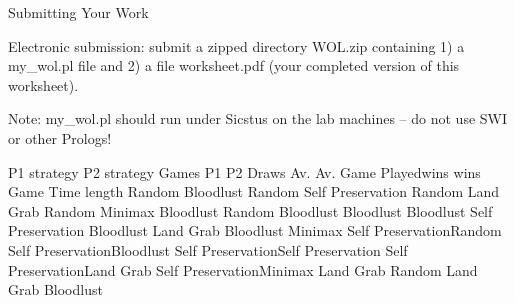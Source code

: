 \documentclass[a4wide, 11pt]{article}
\begin{document}
Submitting Your Work

Electronic submission: submit a zipped directory WOL.zip containing 1) a
my\_wol.pl file and 2) a file worksheet.pdf (your completed version of
this worksheet).

Note: my\_wol.pl should run under Sicstus on the lab machines -- do not
use SWI or other Prologs!

\textbar{}P1 strategy \textbar{}P2 strategy \textbar{}Games \textbar{}P1
\textbar{}P2 \textbar{}Draws \textbar{}Av. \textbar{}Av. Game\textbar{}
\textbar{} \textbar{} \textbar{}Played\textbar{}wins \textbar{}wins
\textbar{} \textbar{}Game \textbar{}Time \textbar{} \textbar{}
\textbar{} \textbar{} \textbar{} \textbar{} \textbar{} \textbar{}length
\textbar{} \textbar{} \textbar{}Random \textbar{}Bloodlust \textbar{}
\textbar{} \textbar{} \textbar{} \textbar{} \textbar{} \textbar{}
\textbar{}Random \textbar{}Self Preservation\textbar{} \textbar{}
\textbar{} \textbar{} \textbar{} \textbar{} \textbar{} \textbar{}Random
\textbar{}Land Grab \textbar{} \textbar{} \textbar{} \textbar{}
\textbar{} \textbar{} \textbar{} \textbar{}Random \textbar{}Minimax
\textbar{} \textbar{} \textbar{} \textbar{} \textbar{} \textbar{}
\textbar{} \textbar{}Bloodlust \textbar{}Random \textbar{} \textbar{}
\textbar{} \textbar{} \textbar{} \textbar{} \textbar{}
\textbar{}Bloodlust \textbar{}Bloodlust \textbar{} \textbar{} \textbar{}
\textbar{} \textbar{} \textbar{} \textbar{} \textbar{}Bloodlust
\textbar{}Self Preservation\textbar{} \textbar{} \textbar{} \textbar{}
\textbar{} \textbar{} \textbar{} \textbar{}Bloodlust \textbar{}Land Grab
\textbar{} \textbar{} \textbar{} \textbar{} \textbar{} \textbar{}
\textbar{} \textbar{}Bloodlust \textbar{}Minimax \textbar{} \textbar{}
\textbar{} \textbar{} \textbar{} \textbar{} \textbar{} \textbar{}Self
Preservation\textbar{}Random \textbar{} \textbar{} \textbar{} \textbar{}
\textbar{} \textbar{} \textbar{} \textbar{}Self
Preservation\textbar{}Bloodlust \textbar{} \textbar{} \textbar{}
\textbar{} \textbar{} \textbar{} \textbar{} \textbar{}Self
Preservation\textbar{}Self Preservation\textbar{} \textbar{} \textbar{}
\textbar{} \textbar{} \textbar{} \textbar{} \textbar{}Self
Preservation\textbar{}Land Grab \textbar{} \textbar{} \textbar{}
\textbar{} \textbar{} \textbar{} \textbar{} \textbar{}Self
Preservation\textbar{}Minimax \textbar{} \textbar{} \textbar{}
\textbar{} \textbar{} \textbar{} \textbar{} \textbar{}Land Grab
\textbar{}Random \textbar{} \textbar{} \textbar{} \textbar{} \textbar{}
\textbar{} \textbar{} \textbar{}Land Grab \textbar{}Bloodlust \textbar{}
\end{document}

